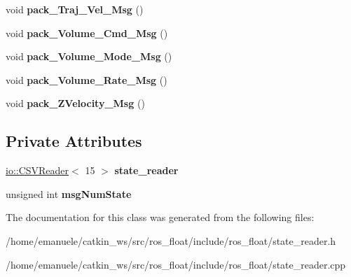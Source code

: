 \begin{DoxyCompactItemize}
void {\bfseries pack\+\_\+\+Traj\+\_\+\+Vel\+\_\+\+Msg} ()
\item 
\mbox{\label{classSTATE__reader_a3d666eec14997c9fe74978abdc5a0fba}} 
void {\bfseries pack\+\_\+\+Volume\+\_\+\+Cmd\+\_\+\+Msg} ()
\item 
\mbox{\label{classSTATE__reader_a28ec1eb37c188f7ee1b6ebaf80d51139}} 
void {\bfseries pack\+\_\+\+Volume\+\_\+\+Mode\+\_\+\+Msg} ()
\item 
\mbox{\label{classSTATE__reader_a5d4dd5f96e71324ce7ff8f6eadb24013}} 
void {\bfseries pack\+\_\+\+Volume\+\_\+\+Rate\+\_\+\+Msg} ()
\item 
\mbox{\label{classSTATE__reader_a64549c42833730c3dbf13034be5303af}} 
void {\bfseries pack\+\_\+\+Z\+Velocity\+\_\+\+Msg} ()
\end{DoxyCompactItemize}
\subsection*{Private Attributes}
\begin{DoxyCompactItemize}
\item 
\mbox{\label{classSTATE__reader_a7b5c2cf312aeeffb3f0d46f9c25f79a4}} 
\hyperlink{classio_1_1CSVReader}{io\+::\+C\+S\+V\+Reader}$<$ 15 $>$ {\bfseries state\+\_\+reader}
\item 
\mbox{\label{classSTATE__reader_a03c62544f89afb1f3b05d87676b574c8}} 
unsigned int {\bfseries msg\+Num\+State}
\end{DoxyCompactItemize}


The documentation for this class was generated from the following files\+:\begin{DoxyCompactItemize}
\item 
/home/emanuele/catkin\+\_\+ws/src/ros\+\_\+float/include/ros\+\_\+float/state\+\_\+reader.\+h\item 
/home/emanuele/catkin\+\_\+ws/src/ros\+\_\+float/include/ros\+\_\+float/state\+\_\+reader.\+cpp\end{DoxyCompactItemize}
